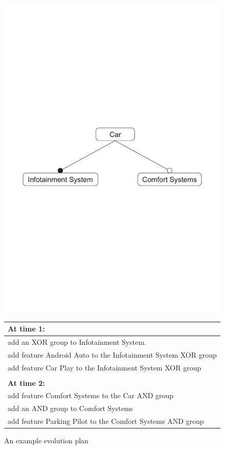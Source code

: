 \documentclass[a4paper,english]{ifimaster}
\begin{document}
\begin{figure}[htpb]
	\centering
	\includegraphics[width=0.8\linewidth]{illustrations/initial.pdf}
	\begin{tabular}{l}
		\textbf{At time 1:}                                           \\ \hline
		add an XOR group to Infotainment System.                      \\
		add feature Android Auto to the Infotainment System XOR group \\
		add feature Car Play to the Infotainment System XOR group     \\
		\\
		\textbf{At time 2:}                                           \\ \hline
		add feature Comfort Systems to the Car AND group              \\
		add an AND group to Comfort Systems                           \\
		add feature Parking Pilot to the Comfort Systems AND group
	\end{tabular}
	\caption{An example evolution plan}%
	\label{fig:exampleplan}
\end{figure}
\end{document}
